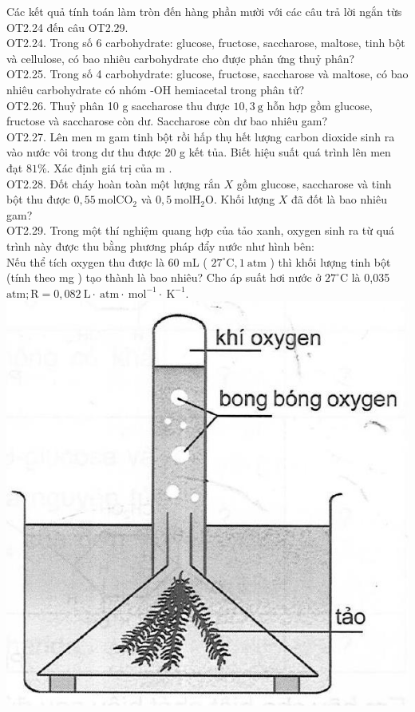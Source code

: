 \documentclass[10pt]{article}
\begin{document}
Các kết quả tính toán làm tròn đến hàng phần mười với các câu trả lời ngắn từs OT2.24 đến câu OT2.29.\\
OT2.24. Trong số 6 carbohydrate: glucose, fructose, saccharose, maltose, tinh bột và cellulose, có bao nhiêu carbohydrate cho được phản ứng thuỷ phân?\\
OT2.25. Trong số 4 carbohydrate: glucose, fructose, saccharose và maltose, có bao nhiêu carbohydrate có nhóm -OH hemiacetal trong phân tử?\\
OT2.26. Thuỷ phân 10 g saccharose thu được $10,3 \mathrm{~g}$ hỗn hợp gồm glucose, fructose và saccharose còn dư. Saccharose còn dư bao nhiêu gam?\\
OT2.27. Lên men m gam tinh bột rồi hấp thụ hết lượng carbon dioxide sinh ra vào nước vôi trong dư thu được 20 g kết tủa. Biết hiệu suất quá trình lên men đạt $81 \%$. Xác định giá trị của m .\\
OT2.28. Đốt cháy hoàn toàn một lượng rắn $X$ gồm glucose, saccharose và tinh bột thu được $0,55 \mathrm{~mol} \mathrm{CO}_{2}$ và $0,5 \mathrm{~mol} \mathrm{H}_{2} \mathrm{O}$. Khối lượng $X$ đã đốt là bao nhiêu gam?\\
OT2.29. Trong một thí nghiệm quang hợp của tảo xanh, oxygen sinh ra từ quá trình này được thu bằng phương pháp đẩy nước như hình bên:\\
Nếu thể tích oxygen thu được là 60 mL ( $27^{\circ} \mathrm{C}, 1 \mathrm{~atm}$ ) thì khối lượng tinh bột (tính theo mg ) tạo thành là bao nhiêu? Cho áp suất hơi nước ở $27^{\circ} \mathrm{C}$ là 0,035 $\mathrm{atm} ; \mathrm{R}=0,082 \mathrm{~L} \cdot \mathrm{~atm} \cdot \mathrm{~mol}^{-1} \cdot \mathrm{~K}^{-1}$.\\
\includegraphics[max width=\textwidth, center]{2025_10_23_de6f5713836e4e91b3c8g-044}
\end{document}
